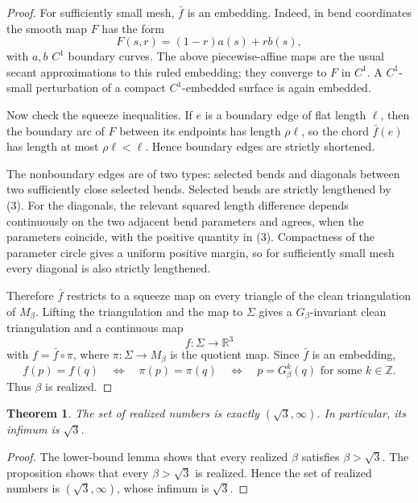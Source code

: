 \documentclass[11pt]{article}
\newtheorem{theorem}{Theorem}
\newcommand{\R}{\mathbb R}
\newcommand{\Z}{\mathbb Z}
\begin{document}
\begin{proof}
For sufficiently small mesh, \(\bar f\) is an embedding.  Indeed, in bend coordinates the smooth map \(F\) has the form
\[
F(s,r)=(1-r)a(s)+r b(s),
\]
with \(a,b\) \(C^1\) boundary curves.  The above piecewise-affine maps are the usual secant approximations to this ruled embedding; they converge to \(F\) in \(C^1\).  A \(C^1\)-small perturbation of a compact \(C^1\)-embedded surface is again embedded.

Now check the squeeze inequalities.  If \(e\) is a boundary edge of flat length \(\ell\), then the boundary arc of \(F\) between its endpoints has length \(\rho\ell\), so the chord \(\bar f(e)\) has length at most \(\rho\ell<\ell\).  Hence boundary edges are strictly shortened.

The nonboundary edges are of two types: selected bends and diagonals between two sufficiently close selected bends.  Selected bends are strictly lengthened by (3).  For the diagonals, the relevant squared length difference depends continuously on the two adjacent bend parameters and agrees, when the parameters coincide, with the positive quantity in (3).  Compactness of the parameter circle gives a uniform positive margin, so for sufficiently small mesh every diagonal is also strictly lengthened.

Therefore \(\bar f\) restricts to a squeeze map on every triangle of the clean triangulation of \(M_\beta\).  Lifting the triangulation and the map to \(\Sigma\) gives a \(G_\beta\)-invariant clean triangulation and a continuous map
\[
f:\Sigma\to\R^3
\]
with \(f=\bar f\circ \pi\), where \(\pi:\Sigma\to M_\beta\) is the quotient map.  Since \(\bar f\) is an embedding,
\[
f(p)=f(q)\quad\Longleftrightarrow\quad \pi(p)=\pi(q)
\quad\Longleftrightarrow\quad p=G_\beta^k(q)\text{ for some }k\in\Z.
\]
Thus \(\beta\) is realized.
\end{proof}

\begin{theorem}
The set of realized numbers is exactly \((\sqrt3,\infty)\).  In particular, its infimum is \(\sqrt3\).
\end{theorem}

\begin{proof}
The lower-bound lemma shows that every realized \(\beta\) satisfies \(\beta>\sqrt3\).  The proposition shows that every \(\beta>\sqrt3\) is realized.  Hence the set of realized numbers is \((\sqrt3,\infty)\), whose infimum is \(\sqrt3\).
\end{proof}
\end{document}

